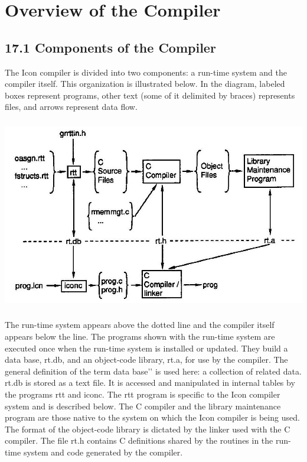 \chapter{Overview of the Compiler}

\section[17.1 Components of the Compiler]{17.1 Components of the Compiler}

The Icon compiler is divided into two components: a run-time system
and the compiler itself. This organization is illustrated below. In
the diagram, labeled boxes represent programs, other text (some of it
delimited by braces) represents files, and arrows represent data flow.

\noindent\includegraphics[width=6.0in,height=3.3in]{kw/figure5-1.png}

The run-time system appears above the dotted line and the compiler
itself appears below the line. The programs shown with the run-time
system are executed once when the run-time system is installed or
updated. They build a data base, rt.db, and an object-code library,
rt.a, for use by the compiler. The general definition of the term
{\textasciigrave}{\textasciigrave}data base'{}' is used here: a
collection of related data. rt.db is stored as a text file. It is
accessed and manipulated in internal tables by the programs rtt and
iconc. The rtt program is specific to the Icon compiler system and is
described below. The C compiler and the library maintenance program
are those native to the system on which the Icon compiler is being
used. The format of the object-code library is dictated by the linker
used with the C compiler. The file rt.h contains C definitions shared
by the routines in the run-time system and code generated by the
compiler.

